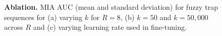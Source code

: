 \begin{figure}[ht]
\centering
{}

    \caption{\textbf{Ablation.} MIA AUC (mean and standard deviation) for fuzzy trap sequences for (a) varying $k$ for $R=8$, (b) $k=50$ and $k=50,000$ across $R$ and (c) varying learning rate used in fine-tuning.} 
\label{fig:robustness}
\end{figure} 

